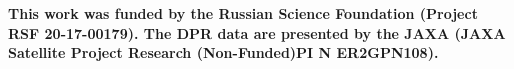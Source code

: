 \documentclass{article}
\begin{document}
\textbf{This work   was   funded   by   the   Russian   Science Foundation
(Project RSF 20-17-00179). The DPR data are presented  by  the  JAXA  (JAXA
Satellite  Project  Research (Non-Funded)PI  N ER2GPN108).}


\newpage


\end{document}
